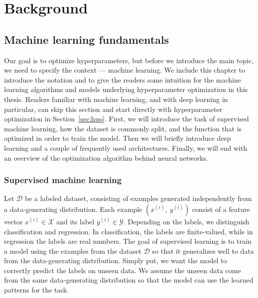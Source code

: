 \chapter{Background}

\label{chap:refs}

\section{Machine learning fundamentals}

Our goal is to optimize hyperparameters, but before we introduce the main topic, we need to specify the context --- machine learning. We include this chapter to introduce the notation and to give the readers some intuition for the machine learning algorithms and models underlying hyperparameter optimization in this thesis. Readers familiar with machine learning, and with deep learning in particular, can skip this section and start directly with hyperparameter optimization in Section~\ref{sec:hpo}. First, we will introduce the task of supervised machine learning, how the dataset is commonly split, and the function that is optimized in order to train the model. Then we will briefly introduce deep learning and a couple of frequently used architectures. Finally, we will end with an overview of the optimization algorithm behind neural networks.






\subsection{Supervised machine learning}
Let $\mathcal{D}$ be a labeled dataset, consisting of examples generated independently from a data-generating distribution. Each example $(x^{(i)}, \  y^{(i)})$ consist of a feature vector $x^{(i)}\in \mathcal{X}$ and its label $y^{(i)}\in \mathcal{Y}$. Depending on the labels, we distinguish classification and regression. In classification, the labels are finite-valued, while in regression the labels are real numbers. The goal of supervised learning is to train a model using the examples from the dataset $\mathcal{D}$ so that it generalizes well to data from the data-generating distribution. Simply put, we want the model to correctly predict the labels on unseen data. We assume the unseen data come from the same data-generating distribution so that the model can use the learned patterns for the task.  %

